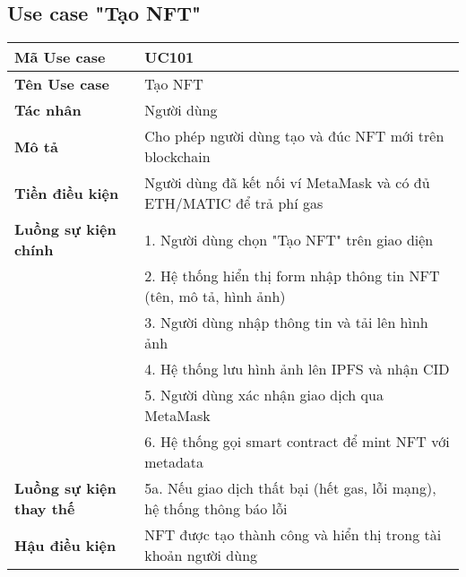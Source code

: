 \subsection{Use case "Tạo NFT"}
\begin{tabular}{|l|p{10cm}|}
    \hline
    \textbf{Mã Use case} & UC101 \\
    \hline
    \textbf{Tên Use case} & Tạo NFT \\
    \hline
    \textbf{Tác nhân} & Người dùng \\
    \hline
    \textbf{Mô tả} & Cho phép người dùng tạo và đúc NFT mới trên blockchain \\
    \hline
    \textbf{Tiền điều kiện} & Người dùng đã kết nối ví MetaMask và có đủ ETH/MATIC để trả phí gas \\
    \hline
    \textbf{Luồng sự kiện chính} & 1. Người dùng chọn "Tạo NFT" trên giao diện \\
    & 2. Hệ thống hiển thị form nhập thông tin NFT (tên, mô tả, hình ảnh) \\
    & 3. Người dùng nhập thông tin và tải lên hình ảnh \\
    & 4. Hệ thống lưu hình ảnh lên IPFS và nhận CID \\
    & 5. Người dùng xác nhận giao dịch qua MetaMask \\
    & 6. Hệ thống gọi smart contract để mint NFT với metadata \\
    \hline
    \textbf{Luồng sự kiện thay thế} & 5a. Nếu giao dịch thất bại (hết gas, lỗi mạng), hệ thống thông báo lỗi \\
    \hline
    \textbf{Hậu điều kiện} & NFT được tạo thành công và hiển thị trong tài khoản người dùng \\
    \hline
\end{tabular}


